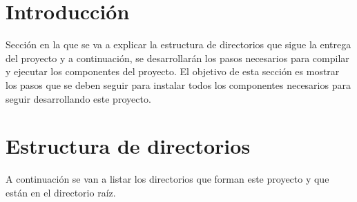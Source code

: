 
\section{Introducción}

Sección en la que se va a explicar la estructura de directorios que sigue la entrega del proyecto y a continuación, se desarrollarán los pasos necesarios para compilar y ejecutar los componentes del proyecto. El objetivo de esta sección es mostrar los pasos que se deben seguir para instalar todos los componentes necesarios para seguir desarrollando este proyecto.

\section{Estructura de directorios}

A continuación se van a listar los directorios que forman este proyecto y que están en el directorio raíz.

